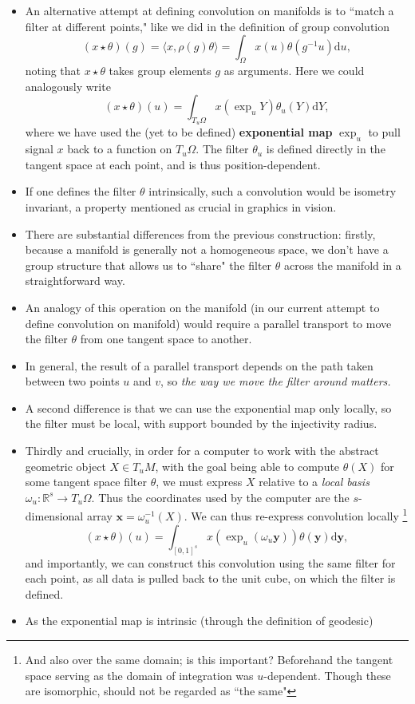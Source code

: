 \documentclass[12pt]{article}
\numberwithin{equation}{section}
\theoremstyle{definition}
\newcommand{		\ra		}	{	\rangle					}
\newcommand{		\la		}	{	\langle					}
\newcommand{		\B		}	{\textbf					} %
\newcommand{		\Oh		}	{	\Omega					}
\newcommand{		\1		}	{	\bm{1}					}%
\begin{document}
\begin{itemize}
\item An alternative attempt at defining convolution on manifolds is to ``match a filter at different points," like we did in the definition of group convolution
$$
(x \star \theta) (g) = \la x , \rho(g) \theta \ra = \int_\Oh x(u) \theta(g^{-1} u) \textrm{d} u ,
$$
noting that $x \star \theta$ takes group elements $g$ as arguments. Here we could analogously write
$$
(x \star \theta ) (u) = \int_{T_u \Oh} x (\exp_u Y ) \theta_u (Y) \textrm{d} Y,
$$
where we have used the (yet to be defined) \B{exponential map} $\exp_u$ to pull signal $x$ back to a function on $T_u\Oh$. The filter $\theta_u$ is defined directly in the tangent space at each point, and is thus position-dependent.
\item If one defines the filter $\theta$ intrinsically, such a convolution would be isometry invariant, a property mentioned as crucial in graphics in vision.
\item There are substantial differences from the previous construction: firstly, because a manifold is generally not a homogeneous space, we don't have a group structure that allows us to ``share" the filter $\theta$ across the manifold in a straightforward way. 
\item An analogy of this operation on the manifold (in our current attempt to define convolution on manifold) would require a parallel transport to move the filter $\theta$ from one tangent space to another. 
\item In general, the result of a parallel transport depends on the path taken between two points $u$ and $v$, so \emph{the way we move the filter around matters.} 
\item A second difference is that we can use the exponential map only locally, so the filter must be local, with support bounded by the injectivity radius. 
\item Thirdly and crucially, in order for a computer to work with the abstract geometric object $X \in T_uM$, with the goal being able to compute $\theta(X)$ for some tangent space filter $\theta$, we must express $X$ relative to a \emph{local basis} $\omega_u : \mathbb{R}^s \to T_u \Omega$. Thus the coordinates used by the computer are the $s$-dimensional array $\mathbf{x} = \omega_u^{-1}(X)$. We can thus re-express convolution locally \footnote{ And also over the same domain; is this important? Beforehand the tangent space serving as the domain of integration was $u$-dependent. Though these are isomorphic, should not be regarded as ``the same"}
$$
(x \star \theta) (u) = \int_{ [0,1]^s } x (\exp_u(\omega_u \mathbf{y} )) \theta (\mathbf{y}) \textrm{d} \mathbf{y},
$$
and importantly, we can construct this convolution using the same filter for each point, as all data is pulled back to the unit cube, on which the filter is defined.
\item As the exponential map is intrinsic (through the definition of geodesic)
\end{itemize}
\end{document}
